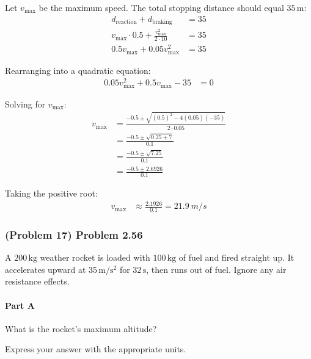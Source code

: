 \begin{solution}
	Let \( v_{\mathrm{max}} \) be the maximum speed. The total stopping distance should equal \( 35 \, \mathrm{m} \):
	\begin{align*}
		d_{\mathrm{reaction}} + d_{\mathrm{braking}} &= 35 \\
		v_{\mathrm{max}} \cdot 0.5 + \frac{v_{\mathrm{max}}^2}{2 \cdot 10} &= 35 \\
		0.5 v_{\mathrm{max}} + 0.05 v_{\mathrm{max}}^2 &= 35
	\end{align*}

	Rearranging into a quadratic equation:
	\begin{align*}
		0.05 v_{\mathrm{max}}^2 + 0.5 v_{\mathrm{max}} - 35 &= 0
	\end{align*}

	Solving for \( v_{\mathrm{max}} \):
	\begin{align*}
		v_{\mathrm{max}} &= \frac{ -0.5 \pm \sqrt{(0.5)^2 - 4(0.05)(-35)} }{2 \cdot 0.05} \\
		&= \frac{ -0.5 \pm \sqrt{0.25 + 7} }{0.1} \\
		&= \frac{ -0.5 \pm \sqrt{7.25} }{0.1} \\
		&= \frac{ -0.5 \pm 2.6926 }{0.1}
	\end{align*}

	Taking the positive root:
	\begin{align*}
		v_{\mathrm{max}} &\approx \frac{2.1926}{0.1} = \boxed{\SI{21.9}{m/s}}
	\end{align*}
\end{solution}

\newpage

\subsubsection{(Problem 17) Problem 2.56}

A \( 200 \, \mathrm{kg} \) weather rocket is loaded with \( 100 \, \mathrm{kg} \) of fuel and fired straight up. It accelerates upward at \( 35 \, \mathrm{m/s^2} \) for \( 32 \, \mathrm{s} \), then runs out of fuel. Ignore any air resistance effects.

\paragraph{Part A}
What is the rocket's maximum altitude?

Express your answer with the appropriate units.

